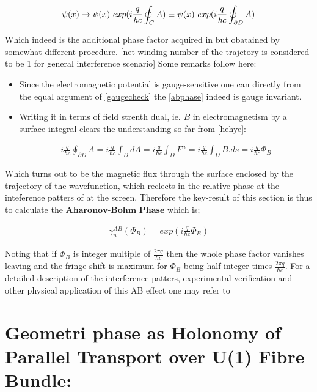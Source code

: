 \documentclass[8pt, twocoloumn]{article}
\begin{document}
\begin{align}{\label{abphase}}
\psi(x) \to \psi(x) \ exp (i\frac{q}{\hbar c}\oint_{C}A) \equiv \psi(x) \ exp (i\frac{q}{\hbar c}\oint_{\partial D}A)
\end{align}

Which indeed is the additional phase factor acquired in \cite{ab} but obatained by somewhat different procedure. [net winding number of the trajctory is considered to be 1 for general interference scenario]
Some remarks follow here:

\begin{itemize}
\item Since the electromagnetic potential is gauge-sensitive one can directly from the equal argument of \ref{gaugecheck} the \ref{abphase} indeed is gauge invariant.

\item Writing it in terms of field strenth dual, ie. $B$ in electromagnetism by a surface integral clears the understanding so far from \ref{hehye}: 

\begin{align}
i\frac{q}{\hbar c}\oint_{\partial D}A = i\frac{q}{\hbar c}\int_{D} dA = i\frac{q}{\hbar c}\int_{D} F^n = i\frac{q}{\hbar c}\int_{D} B .ds = i\frac{q}{\hbar c} \Phi_B  
\end{align}
\end{itemize}

Which turns out to be the magnetic flux through the surface enclosed by the trajectory of the wavefunction, which reclects in the relative phase at the inteference patters of at the screen. Therefore the key-result of this section is thus to calculate the $\textbf{Aharonov-Bohm Phase}$ which is;

\begin{align}
\gamma_{n}^{AB}(\Phi_B)= exp (i\frac{q}{\hbar c}\Phi_B  )
\end{align} 

Noting that if $\Phi_B$ is integer multiple of $\frac{2\pi q}{\hbar c}$ then the whole phase factor vanishes leaving and the fringe shift is maximum for $\Phi_B$ being half-integer times $\frac{2\pi q}{\hbar c}$. For a detailed description of the interference patters, experimental verification and other physical application of this AB effect one may refer to \cite{goodone}
\section{Geometri phase as Holonomy of Parallel Transport over U(1) Fibre Bundle:}
\end{document}
